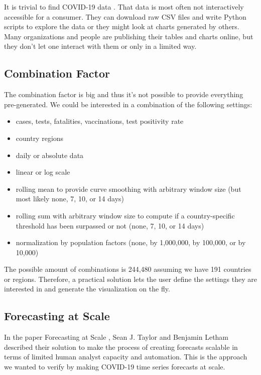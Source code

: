 It is trivial to find COVID-19 data \cite{b7}. That data is most often not interactively accessible for a consumer. They can download raw CSV files and write Python scripts to explore the data or they might look at charts generated by others. Many organizations and people are publishing their tables and charts online, but they don’t let one interact with them or only in a limited way.

\subsection{Combination Factor}

The combination factor is big and thus it's not possible to provide everything pre-generated. We could be interested in a combination of the following settings:

\begin{itemize}
    \item cases, tests, fatalities, vaccinations, test positivity rate
    \item country regions
    \item daily or absolute data
    \item linear or log scale
    \item rolling mean to provide curve smoothing with arbitrary window size (but most likely none, 7, 10, or 14 days)
    \item rolling sum with arbitrary window size to compute if a country-specific threshold has been surpassed or not (none, 7, 10, or 14 days)
    \item normalization by population factors (none, by 1,000,000, by 100,000, or by 10,000)
\end{itemize}

The possible amount of combinations is 244,480 assuming we have 191 countries or regions. Therefore, a practical solution lets the user define the settings they are interested in and generate the visualization on the fly. 


\subsection{Forecasting at Scale}

In the paper Forecasting at Scale \cite{b1}, Sean J. Taylor and Benjamin Letham described their solution to make the process of creating forecasts scalable in terms of limited human analyst capacity and automation. This is the approach we wanted to verify by making COVID-19 time series forecasts at scale.

